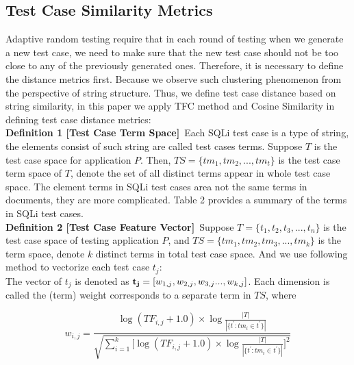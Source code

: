 \documentclass{sig-alternate}
\begin{document}
\subsection{Test Case Similarity Metrics}
Adaptive random testing require that in each round of testing when we generate a new
test case, we need to make sure that the new test case should not be too close
to any of the previously generated ones. Therefore, it is necessary to define the distance metrics first. Because we observe such clustering phenomenon from the perspective of string structure. Thus, we define test case distance based on string similarity, in this paper we apply TFC method and Cosine Similarity in defining test case distance metrics:\\

{\bf Definition 1 [Test Case Term Space]}~Each SQLi test case is a type of string, the elements consist of such string are called test cases terms. Suppose $T$ is the test case space for application $P$. Then, $TS = \{tm_{1},tm_{2},...,tm_{t}\}$ is the test case term space of $T$, denote the set of all distinct terms appear in whole test case space. The element terms in SQLi test cases area not the same terms in documents, they are more complicated. Table 2 provides a summary of the terms in SQLi test cases.\\








{\bf Definition 2 [Test Case Feature Vector]}~Suppose $T = \{t_{1}, t_{2}, t_{3},...,  t_{n}\}$ is the test case space of testing application $P$, and $TS = \{tm_{1}, tm_{2}, tm_{3},..., tm_{k}\}$ is the term space, denote $k$ distinct terms in total test case space. And we use following method to vectorize each test case $t_{j}$:\\

 The vector of $t_{j}$ is denoted as  ${\bf  t_{j}} = [{w_{1,j}, w_{2,j}, w_{3,j} ... , w_{k,j}]}$. Each dimension is called the (term) weight corresponds to a separate term in $TS$, where 

\begin{equation}w_{i,j} = \frac { \log{(TF_{i,j} + 1.0)} \times \log \frac{|T|}{|\{t^{'} : tm_i \in t^{'}\}|} }{\sqrt{ \sum_{i=1}^{k} \lbrack \log{(TF_{i,j} + 1.0)} \times \log \frac{|T|}{|\{t^{'} : tm_i \in t^{'}\}|}\rbrack ^{2} }}
\end{equation}
\end{document}
